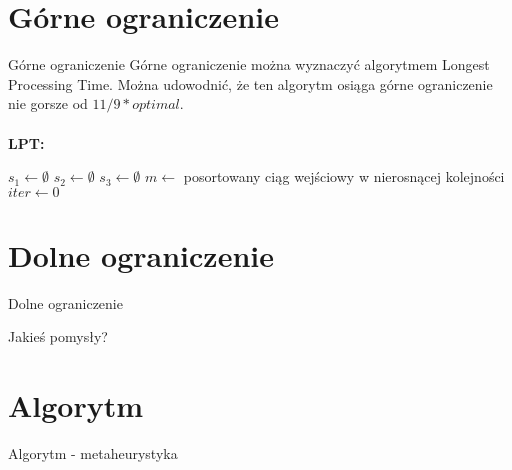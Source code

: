 \documentclass{beamer}
\begin{document}
\section{Górne ograniczenie}

\begin{frame}{Górne ograniczenie}
Górne ograniczenie można wyznaczyć algorytmem Longest Processing Time. Można udowodnić, że ten algorytm osiąga górne ograniczenie nie gorsze od $11/9*optimal$.\\~\\
\textbf{LPT:}\\
\begin{algorithm}[H]
 $s_1 \gets \emptyset$\;
 $s_2 \gets \emptyset$\;
 $s_3 \gets \emptyset$\;
 $m \gets $ posortowany ciąg wejściowy w nierosnącej kolejności\;
 $iter \gets 0$\;
\end{algorithm} 

  

\end{frame}

\section{Dolne ograniczenie}

\begin{frame}{Dolne ograniczenie}

Jakieś pomysły?

\end{frame}

\section{Algorytm}

\begin{frame}{Algorytm - metaheurystyka}


\end{frame}
\end{document}
